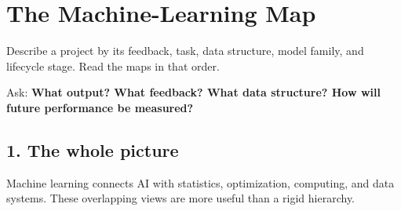 
\chapter*{The Machine-Learning Map}

Describe a project by its feedback, task, data structure, model family, and lifecycle stage. Read the maps in that order.

\begin{keyidea}
Ask: \textbf{What output? What feedback? What data structure? How will future performance be measured?}
\end{keyidea}

\section*{1. The whole picture}

Machine learning connects AI with statistics, optimization, computing, and data systems. These overlapping views are more useful than a rigid hierarchy.

